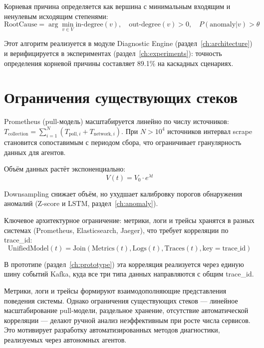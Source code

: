 Корневая причина определяется как вершина с минимальным входящим и ненулевым исходящим степенями:
\begin{equation}
\text{RootCause} = \arg\min_{v \in V} \text{in-degree}(v), \quad \text{out-degree}(v) > 0, \quad P(\text{anomaly}|v) > \theta
\label{eq:root_cause_search}
\end{equation}

Этот алгоритм реализуется в модуле Diagnostic Engine (раздел~\ref{ch:architecture}) и верифицируется в экспериментах (раздел~\ref{ch:experiments}): точность определения корневой причины составляет 89.1\% на каскадных сценариях.

\section{Ограничения существующих стеков}

Prometheus (pull-модель) \cite{prometheus_paper,prometheus_docs} масштабируется линейно по числу источников: $T_{\text{collection}} = \sum_{i=1}^{N} (T_{\text{poll},i} + T_{\text{network},i})$. При $N > 10^4$ источников интервал scrape становится сопоставимым с периодом сбора, что ограничивает гранулярность данных для агентов.

Объём данных растёт экспоненциально:
\begin{equation}
V(t) = V_0 \cdot e^{\lambda t}
\label{eq:storage_growth}
\end{equation}

Downsampling снижает объём, но ухудшает калибровку порогов обнаружения аномалий (Z-score и LSTM, раздел~\ref{ch:anomaly}).

Ключевое архитектурное ограничение: метрики, логи и трейсы хранятся в разных системах (Prometheus, Elasticsearch, Jaeger), что требует корреляции по trace\_id:
\begin{equation}
\text{UnifiedModel}(t) = \text{Join}(\text{Metrics}(t), \text{Logs}(t), \text{Traces}(t), \text{key} = \text{trace\_id})
\label{eq:unified_model}
\end{equation}

В прототипе (раздел~\ref{ch:prototype}) эта корреляция реализуется через единую шину событий Kafka, куда все три типа данных направляются с общим trace\_id.

\medskip

Метрики, логи и трейсы формируют взаимодополняющие представления поведения системы. Однако ограничения существующих стеков --- линейное масштабирование pull-модели, раздельное хранение, отсутствие автоматической корреляции --- делают ручной анализ неэффективным при росте числа сервисов. Это мотивирует разработку автоматизированных методов диагностики, реализуемых через автономных агентов.
